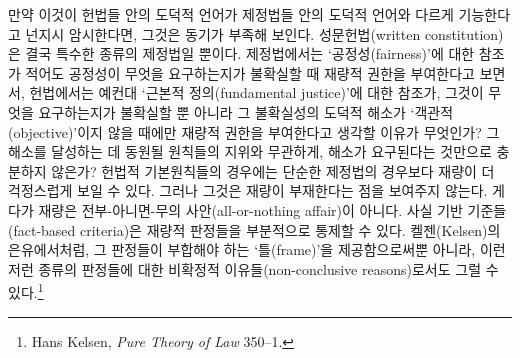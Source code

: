 만약 이것이 헌법들 안의 도덕적 언어가 제정법들 안의 도덕적 언어와 다르게
기능한다고 넌지시 암시한다면, 그것은 동기가 부족해 보인다.
성문헌법(written constitution)은 결국 특수한 종류의 제정법일 뿐이다.
제정법에서는 ‘공정성(fairness)’에 대한 참조가 적어도 공정성이 무엇을
요구하는지가 불확실할 때 재량적 권한을 부여한다고 보면서, 헌법에서는
예컨대 ‘근본적 정의(fundamental justice)’에 대한 참조가, 그것이 무엇을
요구하는지가 불확실할 뿐 아니라 그 불확실성의 도덕적 해소가
‘객관적(objective)’이지 않을 때에만 재량적 권한을 부여한다고 생각할
이유가 무엇인가? 그 해소를 달성하는 데 동원될 원칙들의 지위와 무관하게,
해소가 요구된다는 것만으로 충분하지 않은가? 헌법적 기본원칙들의 경우에는
단순한 제정법의 경우보다 재량이 더 걱정스럽게 보일 수 있다. 그러나
그것은 재량이 부재한다는 점을 보여주지 않는다. 게다가 재량은
전부-아니면-무의 사안(all-or-nothing affair)이 아니다. 사실 기반
기준들(fact-based criteria)은 재량적 판정들을 부분적으로 통제할 수 있다.
켈젠(Kelsen)의 은유에서처럼, 그 판정들이 부합해야 하는 ‘틀(frame)’을
제공함으로써뿐 아니라, 이런저런 종류의 판정들에 대한 비확정적
이유들(non-conclusive reasons)로서도 그럴 수 있다.\footnote{Hans Kelsen,
  \emph{Pure Theory of Law} 350--1.}

